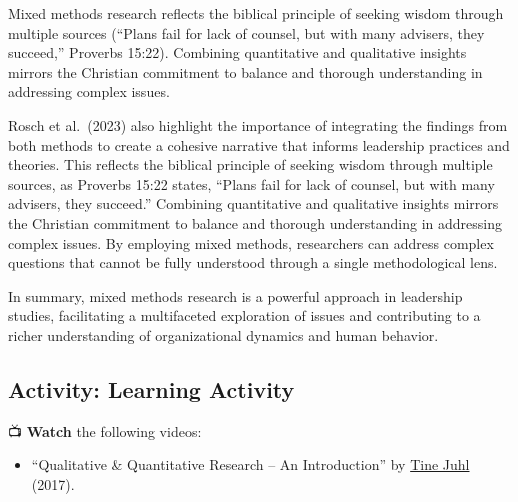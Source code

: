 \documentclass[
  letterpaper,
  DIV=11,
  numbers=noendperiod]{scrreprt}
\providecommand{\tightlist}{%
  \setlength{\itemsep}{0pt}\setlength{\parskip}{0pt}}\usepackage{longtable,booktabs,array}
\begin{document}
Mixed methods research reflects the biblical principle of seeking wisdom
through multiple sources (``Plans fail for lack of counsel, but with
many advisers, they succeed,'' Proverbs 15:22). Combining quantitative
and qualitative insights mirrors the Christian commitment to balance and
thorough understanding in addressing complex issues.

Rosch et al.~(2023) also highlight the importance of integrating the
findings from both methods to create a cohesive narrative that informs
leadership practices and theories. This reflects the biblical principle
of seeking wisdom through multiple sources, as Proverbs 15:22 states,
``Plans fail for lack of counsel, but with many advisers, they
succeed.'' Combining quantitative and qualitative insights mirrors the
Christian commitment to balance and thorough understanding in addressing
complex issues. By employing mixed methods, researchers can address
complex questions that cannot be fully understood through a single
methodological lens.

In summary, mixed methods research is a powerful approach in leadership
studies, facilitating a multifaceted exploration of issues and
contributing to a richer understanding of organizational dynamics and
human behavior.

\subsection*{Activity: Learning
Activity}\label{activity-learning-activity-3}

📺 \textbf{Watch} the following videos:

\begin{itemize}
\tightlist
\item
  ``Qualitative \& Quantitative Research -- An Introduction'' by
  \href{https://www.youtube.com/@TineJuhl}{Tine Juhl} (2017).
\end{itemize}
\end{document}
